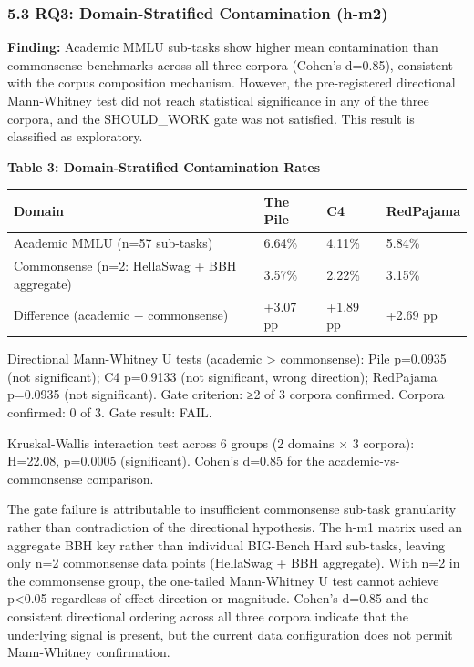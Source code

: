 \subsubsection{5.3 RQ3: Domain-Stratified Contamination (h-m2)}

\textbf{Finding:} Academic MMLU sub-tasks show higher mean contamination than commonsense benchmarks across all three corpora (Cohen's d=0.85), consistent with the corpus composition mechanism. However, the pre-registered directional Mann-Whitney test did not reach statistical significance in any of the three corpora, and the SHOULD_WORK gate was not satisfied. This result is classified as exploratory.

\textbf{Table 3: Domain-Stratified Contamination Rates}

\begin{table}[htbp]
\centering
\begin{tabular}{llll}
\toprule
Domain & The Pile & C4 & RedPajama \\
\midrule
Academic MMLU (n=57 sub-tasks) & 6.64\% & 4.11\% & 5.84\% \\
Commonsense (n=2: HellaSwag + BBH aggregate) & 3.57\% & 2.22\% & 3.15\% \\
Difference (academic − commonsense) & +3.07 pp & +1.89 pp & +2.69 pp \\
\bottomrule
\end{tabular}
\end{table}

Directional Mann-Whitney U tests (academic > commonsense): Pile p=0.0935 (not significant); C4 p=0.9133 (not significant, wrong direction); RedPajama p=0.0935 (not significant). Gate criterion: ≥2 of 3 corpora confirmed. Corpora confirmed: 0 of 3. Gate result: FAIL.

Kruskal-Wallis interaction test across 6 groups (2 domains × 3 corpora): H=22.08, p=0.0005 (significant). Cohen's d=0.85 for the academic-vs-commonsense comparison.

The gate failure is attributable to insufficient commonsense sub-task granularity rather than contradiction of the directional hypothesis. The h-m1 matrix used an aggregate BBH key rather than individual BIG-Bench Hard sub-tasks, leaving only n=2 commonsense data points (HellaSwag + BBH aggregate). With n=2 in the commonsense group, the one-tailed Mann-Whitney U test cannot achieve p<0.05 regardless of effect direction or magnitude. Cohen's d=0.85 and the consistent directional ordering across all three corpora indicate that the underlying signal is present, but the current data configuration does not permit Mann-Whitney confirmation.

